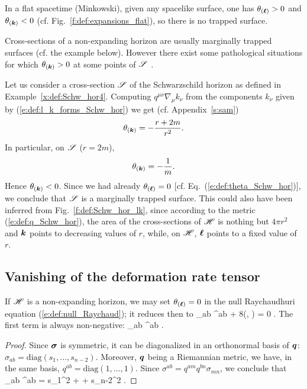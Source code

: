 {{In a flat spacetime (Minkowski), given any spacelike surface,
one has $\theta_{(\bm{\ell})} > 0$ and $\theta_{(\bm{k})} < 0$ (cf. Fig.~\ref{f:def:expansions_flat}), so there
is no trapped surface.

Cross-sections of a non-expanding horizon are usually marginally trapped surfaces
(cf. the example below).
However there exist some pathological situations for
which $\theta_{(\bm{k})} > 0$ at some points of $\mathscr{S}$ \cite{GerocH82}.

\begin{example}
Let us consider a cross-section $\mathscr{S}$ of the Schwarzschild horizon as
defined in Example~\ref{x:def:Schw_hor4}.
Computing $q^{\mu\nu} \nabla_\mu k_\nu$ from the components $k_\nu$
given by (\ref{e:def:l_k_forms_Schw_hor}) we get (cf. Appendix~\ref{s:sam})
\[
    \theta_{(\bm{k})} = - \frac{r+2m}{r^2} .
\]
In particular, on $\mathscr{S}$ ($r=2m$),
\[
    \theta_{(\bm{k})}  = - \frac{1}{m} .
\]
Hence $\theta_{(\bm{k})} < 0$. Since we had already $\theta_{(\bm{\ell})}=0$
[cf. Eq.~(\ref{e:def:theta_Schw_hor})], we conclude that $\mathscr{S}$ is a
marginally trapped surface. This could also have been inferred from
Fig.~\ref{f:def:Schw_hor_lk}, since according to the metric
(\ref{e:def:q_Schw_hor}), the area of the cross-sections of $\mathscr{H}$
is nothing but $4\pi r^2$ and $\bm{k}$ points to decreasing values of $r$, while, on $\mathscr{H}$,
$\bm{\ell}$ points to a fixed value of $r$.
\end{example}

\subsection{Vanishing of the deformation rate tensor} \label{s:def:NEH_Theta_zero}

If $\mathscr{H}$ is a non-expanding horizon, we may set $\theta_{(\bm{\ell})}=0$
in the null Raychaudhuri equation (\ref{e:def:null_Raychaud}); it reduces then
to
\be \label{e:def:null_Raychaud_theta_zero}
    \sigma_{ab} \sigma^{ab} + 8\pi {}(\wl, \wl) = 0 .
\ee
The first term is always non-negative:
\be \label{e:def:sigma_square}
    \sigma_{ab} \sigma^{ab}  .
\ee
\begin{proof}
Since $\bm{\sigma}$ is symmetric, it can be diagonalized
in an orthonormal basis of $\bm{q}$: $\sigma_{ab} = \mathrm{diag}(s_1,\ldots, s_{n-2})$.
Moreover, $\bm{q}$ being a Riemannian metric, we have, in the same basis, $q^{ab} = \mathrm{diag}(1,\ldots,1)$. Since $\sigma^{ab} = q^{am} q^{bn} \sigma_{mn}$, we conclude that
\be \label{e:def:sigma_square_si}
  \sigma_{ab} \sigma^{ab} = s_1^2 + \cdots + s_{n-2}^2  .
\ee
\end{proof}

}}
